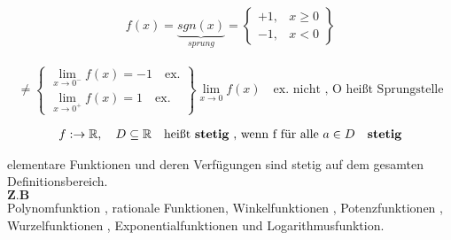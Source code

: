 \begin{example}


$$
f(x) = \underbrace{sgn(x)}_{sprung}  =  \left\{\begin{array}{lr}
       + 1 , & x \geq 0\\
        -1 , & x < 0 
        \end{array}\right\} 
$$
\\
$$
\neq \left\{\begin{array}{lr}
  \lim\limits_{x \rightarrow 0^-}{f(x)} = -1 \quad \text{ex.} \\
        \lim\limits_{x \rightarrow 0^+}{f(x)} = 1 \quad \text{ex.} 
        \end{array}\right\} \lim\limits_{x \rightarrow 0}{f(x)} \quad \text{ex. nicht , O heißt Sprungstelle}
$$  
\end{example}

\begin{definition}
\begin{align*}
f : \rightarrow \mathbb{R} , \quad D \subseteq \mathbb{R} \quad \text{heißt \textbf{stetig} , wenn f für alle } a \in D \quad \textbf{stetig} 
\end{align*}
\end{definition}
\newpage
\begin{example}
elementare Funktionen und deren Verfügungen sind stetig auf dem gesamten Definitionsbereich. \\
$\textbf{Z.B}$ \\
Polynomfunktion , rationale Funktionen, Winkelfunktionen , Potenzfunktionen , Wurzelfunktionen , Exponentialfunktionen und Logarithmusfunktion.
     
\end{example}

